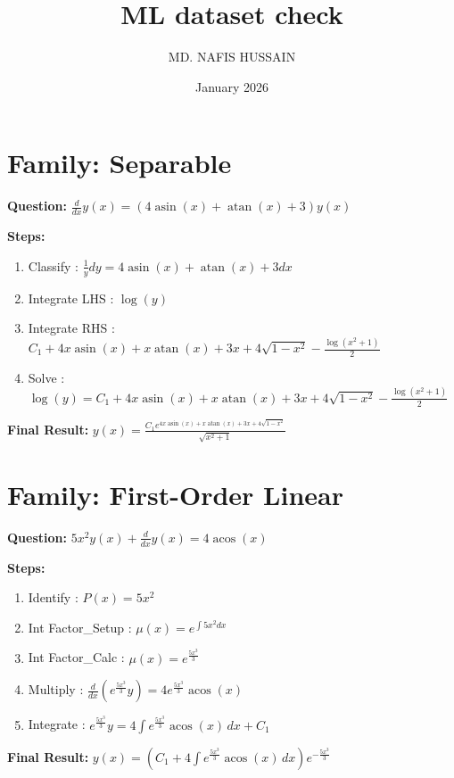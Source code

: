 \documentclass{article}
\title{ML dataset check}
\author{MD. NAFIS HUSSAIN}
\date{January 2026}
\begin{document}
\maketitle
\section*{Family: Separable}
\textbf{Question:} $\frac{d}{d x} y{\left(x \right)} = \left(4 \operatorname{asin}{\left(x \right)} + \operatorname{atan}{\left(x \right)} + 3\right) y{\left(x \right)}$

\textbf{Steps:}
\begin{enumerate}
\item Classify :  $\frac{1}{y} dy = 4 \operatorname{asin}{\left(x \right)} + \operatorname{atan}{\left(x \right)} + 3 dx$
\item Integrate LHS :  $\log{\left(y \right)}$
\item Integrate RHS :  $C_{1} + 4 x \operatorname{asin}{\left(x \right)} + x \operatorname{atan}{\left(x \right)} + 3 x + 4 \sqrt{1 - x^{2}} - \frac{\log{\left(x^{2} + 1 \right)}}{2}$
\item Solve :  $\log{\left(y \right)} = C_{1} + 4 x \operatorname{asin}{\left(x \right)} + x \operatorname{atan}{\left(x \right)} + 3 x + 4 \sqrt{1 - x^{2}} - \frac{\log{\left(x^{2} + 1 \right)}}{2}$
\end{enumerate}
\textbf{Final Result:} $y{\left(x \right)} = \frac{C_{1} e^{4 x \operatorname{asin}{\left(x \right)} + x \operatorname{atan}{\left(x \right)} + 3 x + 4 \sqrt{1 - x^{2}}}}{\sqrt{x^{2} + 1}}$

\section*{Family: First-Order Linear}
\textbf{Question:} $5 x^{2} y{\left(x \right)} + \frac{d}{d x} y{\left(x \right)} = 4 \operatorname{acos}{\left(x \right)}$

\textbf{Steps:}
\begin{enumerate}
\item Identify :  $P(x) = 5 x^{2}$
\item Int Factor_Setup :  $\mu(x) = e^{\int 5 x^{2} dx}$
\item Int Factor_Calc :  $\mu(x) = e^{\frac{5 x^{3}}{3}}$
\item Multiply :  $\frac{d}{dx}(e^{\frac{5 x^{3}}{3}}y) = 4 e^{\frac{5 x^{3}}{3}} \operatorname{acos}{\left(x \right)}$
\item Integrate :  $e^{\frac{5 x^{3}}{3}}y = 4 \int e^{\frac{5 x^{3}}{3}} \operatorname{acos}{\left(x \right)}\, dx + C_1$
\end{enumerate}
\textbf{Final Result:} $y{\left(x \right)} = \left(C_{1} + 4 \int e^{\frac{5 x^{3}}{3}} \operatorname{acos}{\left(x \right)}\, dx\right) e^{- \frac{5 x^{3}}{3}}$
\end{document}
